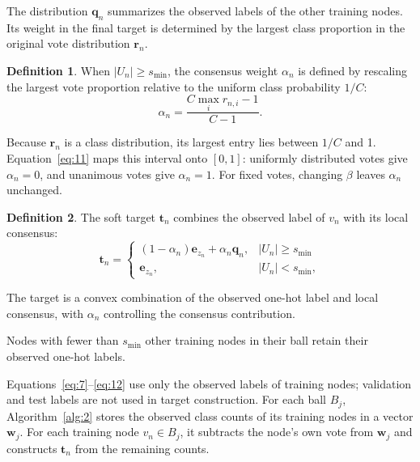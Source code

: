 \documentclass[times,review,10pt]{elsarticle}
\theoremstyle{definition}
\newtheorem{definition}{Definition}
\theoremstyle{plain}
\begin{document}
The distribution \(\mathbf q_n\) summarizes the observed labels of the other training nodes. Its weight in the final target is determined by the largest class proportion in the original vote distribution \(\mathbf r_n\).

\begin{definition}
When \(|U_n|\geq s_{\min}\), the consensus weight \(\alpha_n\) is defined by rescaling the largest vote proportion relative to the uniform class probability \(1/C\):
\begin{equation}\label{eq:11}
\alpha_n=\frac{C\max_i r_{n,i}-1}{C-1}.
\end{equation}
\end{definition}

Because \(\mathbf r_n\) is a class distribution, its largest entry lies between \(1/C\) and 1. Equation~\eqref{eq:11} maps this interval onto \([0,1]\): uniformly distributed votes give \(\alpha_n=0\), and unanimous votes give \(\alpha_n=1\). For fixed votes, changing \(\beta\) leaves \(\alpha_n\) unchanged.

\begin{definition}
The soft target \(\mathbf t_n\) combines the observed label of \(v_n\) with its local consensus:
\begin{equation}\label{eq:12}
\mathbf t_n=
\begin{cases}
(1-\alpha_n)\mathbf e_{z_n}+\alpha_n\mathbf q_n,&|U_n|\geq s_{\min}\\
\mathbf e_{z_n},&|U_n|<s_{\min},
\end{cases}
\end{equation}
\end{definition}

The target is a convex combination of the observed one-hot label and local consensus, with \(\alpha_n\) controlling the consensus contribution.

Nodes with fewer than \(s_{\min}\) other training nodes in their ball retain their observed one-hot labels.

Equations~\eqref{eq:7}--\eqref{eq:12} use only the observed labels of training nodes; validation and test labels are not used in target construction. For each ball \(B_j\), Algorithm~\ref{alg:2} stores the observed class counts of its training nodes in a vector \(\mathbf w_j\). For each training node \(v_n\in B_j\), it subtracts the node's own vote from \(\mathbf w_j\) and constructs \(\mathbf t_n\) from the remaining counts.


\end{document}
